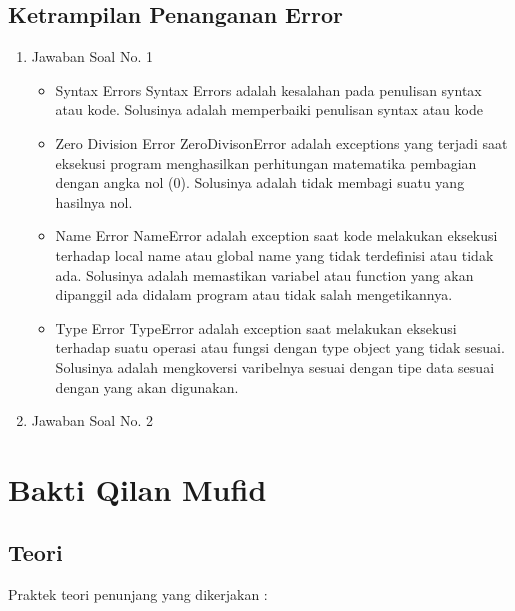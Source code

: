 \subsection{Ketrampilan Penanganan Error}
\begin{enumerate}
\item Jawaban Soal No. 1
\begin{itemize}
\item Syntax Errors
Syntax Errors adalah kesalahan pada penulisan syntax atau kode. Solusinya adalah memperbaiki penulisan syntax atau kode

\item Zero Division Error
ZeroDivisonError adalah exceptions yang terjadi saat eksekusi program menghasilkan perhitungan matematika pembagian dengan angka nol (0). Solusinya adalah tidak membagi suatu yang hasilnya nol.

\item Name Error
NameError adalah exception saat kode melakukan eksekusi terhadap local name atau global name yang tidak terdefinisi atau tidak ada. Solusinya adalah memastikan variabel atau function yang akan dipanggil ada didalam program atau tidak salah mengetikannya.

\item Type Error
TypeError adalah exception saat melakukan eksekusi terhadap suatu operasi atau fungsi dengan type object yang tidak sesuai. Solusinya adalah mengkoversi varibelnya sesuai dengan tipe data sesuai dengan yang akan digunakan.

\end{itemize}

\item Jawaban Soal No. 2																			

\end{enumerate}


\section{Bakti Qilan Mufid}
\subsection{Teori}
Praktek teori penunjang yang dikerjakan :
